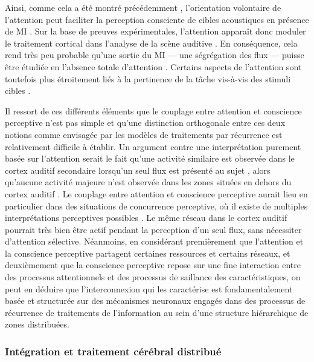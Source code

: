 Ainsi, comme cela a été montré précédemment \citep{leek1991informational, richards2004cuing}, l'orientation volontaire de l'attention peut faciliter la perception consciente de cibles acoustiques en présence de MI \citep{elhilali2009interaction}. 
Sur la base de preuves expérimentales, l'attention apparaît donc moduler le traitement cortical dans l'analyse de la scène auditive \citep{elhilali2009interaction, gutschalk2008neural, molloy2019auditory}. 
En conséquence, cela rend très peu probable qu'une sortie du MI --- une ségrégation des flux --- puisse être étudiée en l'absence totale d'attention \citep{gartner2021auditory}. 
Certains aspects de l'attention sont toutefois plus étroitement liés à la pertinence de la tâche vis-à-vis des stimuli cibles \citep{elgueda2019state, huang2019associations, knyazeva2020representation}. 

Il ressort de ces différents éléments que le couplage entre attention et conscience perceptive n'est pas simple et qu'une distinction orthogonale entre ces deux notions comme envisagée par les modèles de traitements par récurrence \citep{lamme2000distinct, lamme2003visual, lamme2006towards} est relativement difficile à établir. 
Un argument contre une interprétation purement basée sur l'attention serait le fait qu'une activité similaire est observée dans le cortex auditif secondaire lorsqu'un seul flux est présenté au sujet \citep{dykstra2016neural, gutschalk2008neural}, alors qu'aucune activité majeure n'est observée dans les zones situées en dehors du cortex auditif \citep{wiegand2018cortical}. 
Le couplage entre attention et conscience perceptive aurait lieu en particulier dans des situations de concurrence perceptive, où il existe de multiples interprétations perceptives possibles \citep{desimone1995neural, gartner2021auditory}. 
Le même réseau dans le cortex auditif pourrait très bien être actif pendant la perception d'un seul flux, sans nécessiter d'attention sélective. 
Néanmoins, en considérant premièrement que l'attention et la conscience perceptive partagent certaines ressources et certains réseaux, et deuxièmement que la conscience perceptive repose sur une fine interaction entre des processus attentionnels et des processus de saillance des caractéristiques, on peut en déduire que l'interconnexion qui les caractérise est fondamentalement basée et structurée sur des mécanismes neuronaux engagés dans des processus de récurrence de traitements de l'information au sein d'une structure hiérarchique de zones distribuées. 

\subsubsection{Intégration et traitement cérébral distribué}

